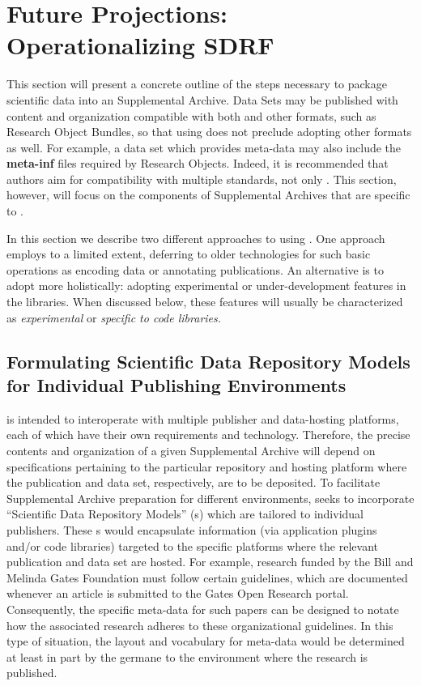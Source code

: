 \documentclass[11pt,letterpaper]{article}
\newcommand{\ATexttclr}[1]{\textcolor{tcolor}{\textbf{#1}}}
\newcommand{\SDRM}{\resizebox{!}{7pt}{\ATexttclr{SDRM}}}
\newcommand{\lSDRF}{\resizebox{!}{8pt}{\ATexttclr{S}}\resizebox{!}{8pt}{\ATexttclr{DR%
\hspace{1pt}{\raisebox{-.5pt}{\fontfamily{qhv}\fontseries{b}\selectfont{}\Large{F}}%
}}}}
\newcommand{\SDRF}{\resizebox{!}{8pt}{\ATexttclr{S}}\resizebox{!}{8pt}{\ATexttclr{DR%
\hspace{1pt}{\raisebox{-1pt}{\fontfamily{qhv}\fontseries{b}\selectfont{}\Large{F}}%
}}}}
\newcommand{\p}[1]{

\vspace{.7em}#1}
\newcommand{\q}[1]{{\fontfamily{qcr}\selectfont ``}#1{\fontfamily{qcr}\selectfont ''}}
\begin{document}
{\vspace{-6pt}
\section{Future Projections: Operationalizing SDRF}

\p{This section will present a concrete outline of the steps 
necessary to package scientific data into an \SDRF{} Supplemental 
Archive.  Data Sets may be published with content and organization 
compatible with both \SDRF{} and other formats, such as 
Research Object Bundles, so that using \SDRF{} does not preclude 
adopting other formats as well.  For example, a data set which 
provides \SDRF{} meta-data may also include the \textbf{meta-inf} 
files required by Research Objects.  Indeed, it is recommended 
that authors aim for compatibility with multiple standards, 
not only \SDRF{}.  This section, however, will focus on the 
components of Supplemental Archives that are specific to \SDRF{}.}

\p{In this section we describe two different approaches to 
using \SDRF{}.  One approach employs \SDRF{} to a limited 
extent, deferring to older technologies for such basic 
operations as encoding data or annotating publications.  
An alternative is to adopt \SDRF{} more holistically: 
adopting experimental or under-development features in the 
\SDRF{} libraries.  When discussed below, these 
features will usually be characterized 
as \textit{experimental} or \textit{specific to \SDRF{} code libraries.}}

\subsection{Formulating Scientific Data Repository Models 
for Individual Publishing Environments}

\p{\lSDRF{} is intended to interoperate with multiple 
publisher and data-hosting platforms, each of which have 
their own requirements and technology.  Therefore, the 
precise contents and organization of a given \SDRF{} 
Supplemental Archive will depend on specifications 
pertaining to the particular repository and hosting platform 
where the publication and data set, respectively, 
are to be deposited.  To facilitate Supplemental Archive 
preparation for different environments, \SDRF{} 
seeks to incorporate \q{Scientific Data Repository Models} 
(\SDRM{}s) which are tailored to individual publishers.  
These \SDRM{}s would encapsulate information (via application 
plugins and/or code libraries) targeted 
to the specific platforms where the relevant publication 
and data set are hosted.  For example, research 
funded by the Bill and Melinda Gates Foundation 
must follow certain guidelines, which are 
documented whenever an article is submitted to the 
Gates Open Research portal.  Consequently, the 
specific \SDRF{} meta-data for such papers can 
be designed to notate how the associated research 
adheres to these organizational guidelines.  
In this type of situation, the layout and vocabulary 
for \SDRF{} meta-data would be determined 
at least in part by the \SDRM{} germane 
to the environment where the research is published.}

}
\end{document}
